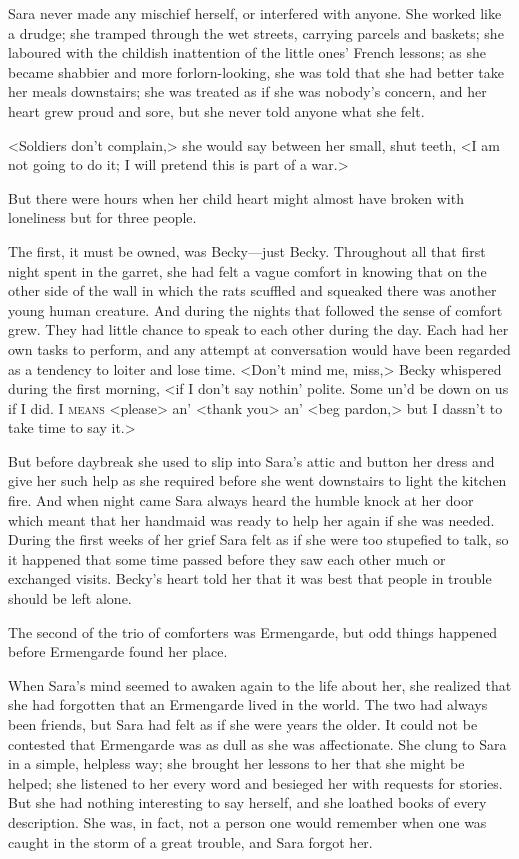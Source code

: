 Sara never made any mischief herself, or interfered with anyone. She worked like a drudge; she tramped through the wet streets, carrying parcels and baskets; she laboured with the childish inattention of the little ones' French lessons; as she became shabbier and more forlorn-looking, she was told that she had better take her meals downstairs; she was treated as if she was nobody's concern, and her heart grew proud and sore, but she never told anyone what she felt.

<Soldiers don't complain,> she would say between her small, shut teeth, <I am not going to do it; I will pretend this is part of a war.>

But there were hours when her child heart might almost have broken with loneliness but for three people.

The first, it must be owned, was Becky—just Becky. Throughout all that first night spent in the garret, she had felt a vague comfort in knowing that on the other side of the wall in which the rats scuffled and squeaked there was another young human creature. And during the nights that followed the sense of comfort grew. They had little chance to speak to each other during the day. Each had her own tasks to perform, and any attempt at conversation would have been regarded as a tendency to loiter and lose time. <Don't mind me, miss,> Becky whispered during the first morning, <if I don't say nothin' polite. Some un'd be down on us if I did. I \textsc{means} <please> an' <thank you> an' <beg pardon,> but I dassn't to take time to say it.>

But before daybreak she used to slip into Sara's attic and button her dress and give her such help as she required before she went downstairs to light the kitchen fire. And when night came Sara always heard the humble knock at her door which meant that her handmaid was ready to help her again if she was needed. During the first weeks of her grief Sara felt as if she were too stupefied to talk, so it happened that some time passed before they saw each other much or exchanged visits. Becky's heart told her that it was best that people in trouble should be left alone.

The second of the trio of comforters was Ermengarde, but odd things happened before Ermengarde found her place.

When Sara's mind seemed to awaken again to the life about her, she realized that she had forgotten that an Ermengarde lived in the world. The two had always been friends, but Sara had felt as if she were years the older. It could not be contested that Ermengarde was as dull as she was affectionate. She clung to Sara in a simple, helpless way; she brought her lessons to her that she might be helped; she listened to her every word and besieged her with requests for stories. But she had nothing interesting to say herself, and she loathed books of every description. She was, in fact, not a person one would remember when one was caught in the storm of a great trouble, and Sara forgot her.

